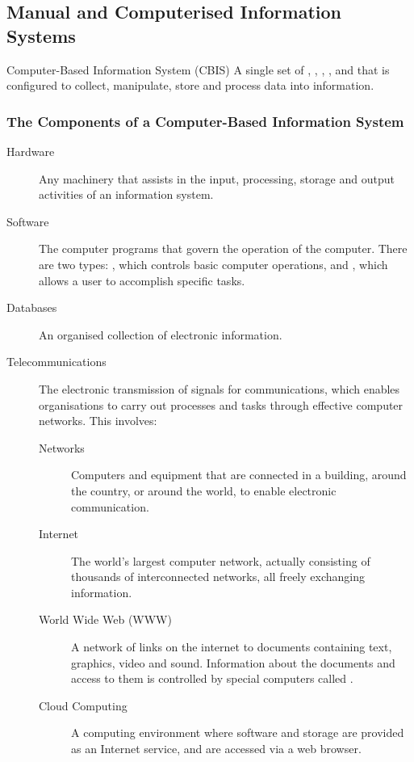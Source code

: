\documentclass[\main/notes.tex]{subfiles}
\begin{document}
			\subsection{Manual and Computerised Information Systems}
				\begin{definition}{Computer-Based Information System (CBIS)}
					A single set of , , , ,  and  that is configured to collect, manipulate, store and process data into information. 
				\end{definition}
				\subsubsection*{The Components of a Computer-Based Information System}
					\begin{description}
						\item[Hardware] Any machinery that assists in the input, processing, storage and output activities of an information system. 
						\item[Software] The computer programs that govern the operation of the computer. There are two types: , which controls basic computer operations, and , which allows a user to accomplish specific tasks.
						\item[Databases] An organised collection of electronic information.
						\item[Telecommunications] The electronic transmission of signals for communications, which enables organisations to carry out processes and tasks through effective computer networks. This involves:
							\begin{description}
								\item[Networks] Computers and equipment that are connected in a building, around the country, or around the world, to enable electronic communication.
								\item[Internet] The world's largest computer network, actually consisting of thousands of interconnected networks, all freely exchanging information.
								\item[World Wide Web (WWW)] A network of links on the internet to documents containing text, graphics, video and sound. Information about the documents and access to them is controlled by special computers called .
								\item[Cloud Computing] A computing environment where software and storage are provided as an Internet service, and are accessed via a web browser.

\end{description}
\end{description}
\end{document}

